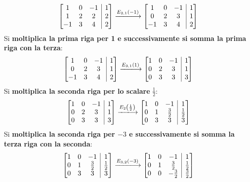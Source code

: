 \documentclass[a4paper]{article}
\makeatletter
\newenvironment{rowequmatbra}[1]{\left[\array{@{}#1@{}}}{\endarray\right]}
\makeatother
\begin{document}
	\begin{equation*}
		\begin{rowequmatbra}{ccc|c}
			1  & 0 & -1 & 1 \\
			1  & 2 &  2 & 2 \\
			-1 & 3 &  4 & 2
		\end{rowequmatbra} \xlongrightarrow{E_{2,1}\left(-1\right)}
		\begin{rowequmatbra}{ccc|c}
			1  & 0 & -1 & 1 \\
			0  & 2 &  3 & 1 \\
			-1 & 3 &  4 & 2
		\end{rowequmatbra}
	\end{equation*}
	Si \textbf{moltiplica la prima riga per 1 e successivamente si somma la prima riga con la terza}:
	\begin{equation*}
		\begin{rowequmatbra}{ccc|c}
			1  & 0 & -1 & 1 \\
			0  & 2 &  3 & 1 \\
			-1 & 3 &  4 & 2
		\end{rowequmatbra} \xlongrightarrow{E_{3,1}\left(1\right)}
		\begin{rowequmatbra}{ccc|c}
			1  & 0 & -1 & 1 \\
			0  & 2 &  3 & 1 \\
			0  & 3 &  3 & 3
		\end{rowequmatbra}
	\end{equation*}
	Si \textbf{moltiplica la seconda riga per lo scalare} $\frac{1}{2}$:
	\begin{equation*}
		\begin{rowequmatbra}{ccc|c}
			1  & 0 & -1 & 1 \\
			0  & 2 &  3 & 1 \\
			0  & 3 &  3 & 3
		\end{rowequmatbra} \xlongrightarrow{E_{2}\left(\frac{1}{2}\right)}
		\begin{rowequmatbra}{ccc|c}
			1  & 0 & -1 & 1 \\
			0  & 1 &  \frac{3}{2} & \frac{1}{2} \\
			0  & 3 &  3 & 3
		\end{rowequmatbra}
	\end{equation*}
	Si \textbf{moltiplica la seconda riga per $-3$ e successivamente si somma la terza riga con la seconda}:
	\begin{equation*}
		\begin{rowequmatbra}{ccc|c}
			1  & 0 & -1 & 1 \\
			0  & 1 &  \frac{3}{2} & \frac{1}{2} \\
			0  & 3 &  3 & 3
		\end{rowequmatbra} \xlongrightarrow{E_{3,2}\left(-3\right)}
		\begin{rowequmatbra}{ccc|c}
			1  & 0 & -1 & 1 \\
			0  & 1 &  \frac{3}{2} & \frac{1}{2} \\
			0  & 0 &  -\frac{3}{2} & \frac{3}{2}
		\end{rowequmatbra}
	\end{equation*}
\end{document}
